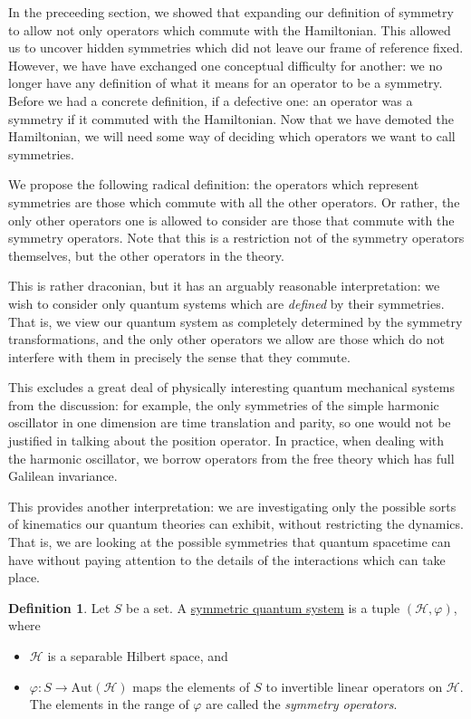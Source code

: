 \documentclass[a4paper,10pt]{scrreprt}
\newcommand{\defn}[1]{\ul{#1}}
\newcommand{\Aut}{\mathrm{Aut}}
\theoremstyle{definition}
\newtheorem{definition}{Definition}[section]
\theoremstyle{plain}
\theoremstyle{remark}
\begin{document}
In the preceeding section, we showed that expanding our definition of symmetry to allow not only operators which commute with the Hamiltonian. This allowed us to uncover hidden symmetries which did not leave our frame of reference fixed. However, we have have exchanged one conceptual difficulty for another: we no longer have any definition of what it means for an operator to be a symmetry. Before we had a concrete definition, if a defective one: an operator was a symmetry if it commuted with the Hamiltonian. Now that we have demoted the Hamiltonian, we will need some way of deciding which operators we want to call symmetries.

We propose the following radical definition: the operators which represent symmetries are those which commute with all the other operators. Or rather, the only other operators one is allowed to consider are those that commute with the symmetry operators. Note that this is a restriction not of the symmetry operators themselves, but the other operators in the theory.

This is rather draconian, but it has an arguably reasonable interpretation: we wish to consider only quantum systems which are \emph{defined} by their symmetries. That is, we view our quantum system as completely determined by the symmetry transformations, and the only other operators we allow are those which do not interfere with them in precisely the sense that they commute. 

This excludes a great deal of physically interesting quantum mechanical systems from the discussion: for example, the only symmetries of the simple harmonic oscillator in one dimension are time translation and parity, so one would not be justified in talking about the position operator. In practice, when dealing with the harmonic oscillator, we borrow operators from the free theory which has full Galilean invariance. 

This provides another interpretation: we are investigating only the possible sorts of kinematics our quantum theories can exhibit, without restricting the dynamics. That is, we are looking at the possible symmetries that quantum spacetime can have without paying attention to the details of the interactions which can take place.

\begin{definition}
  \label{def:symmetricquantumsystem}
  Let $S$ be a set. A \defn{symmetric quantum system} is a tuple $(\mathscr{H}, \varphi)$, where
  \begin{itemize}
    \item $\mathscr{H}$ is a separable Hilbert space, and 

    \item $\varphi\colon S \to \Aut(\mathscr{H})$ maps the elements of $S$ to invertible linear operators on $\mathscr{H}$. The elements in the range of $\varphi$ are called the \emph{symmetry operators}.
  \end{itemize}
\end{definition}
\end{document}
